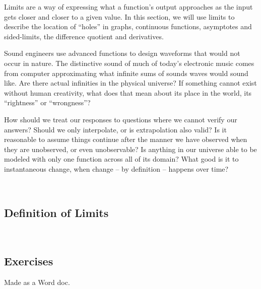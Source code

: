 


Limits are a way of expressing what a function's output approaches as the input gets
closer and closer to a given value.  In this section, we will use limits to describe the 
location of ``holes'' in graphs, continuous functions, asymptotes and sided-limits, 
the difference quotient and derivatives.

Sound engineers use advanced functions to design waveforms that would not occur in nature.
The distinctive sound of much of today's electronic music comes from computer approximating
what infinite sums of sounds waves would sound like.  Are there actual infinities in the physical
universe?  If something cannot exist without human creativity, what does that mean about its
place in the world, its ``rightness'' or ``wrongness''?


How should we treat our responses to questions where we cannot verify our answers?
Should we only interpolate, or is extrapolation also valid?  Is it reasonable to assume
things continue after the manner we have observed when they are unobserved, or even
unobservable?  Is anything in our universe able to be modeled with only one function across
all of its domain? What good is it to instantaneous change, when change -- by definition --
happens over time?



\newpage
\chapterminitoc

\newpage
{}
\newpage

\newpage

~\vfill



{}
\subsection{Definition of Limits}
\noindent{}
\newpage

~\vfill
\newpage
\subsection{Exercises}
Made as a Word doc.
~\vfill


